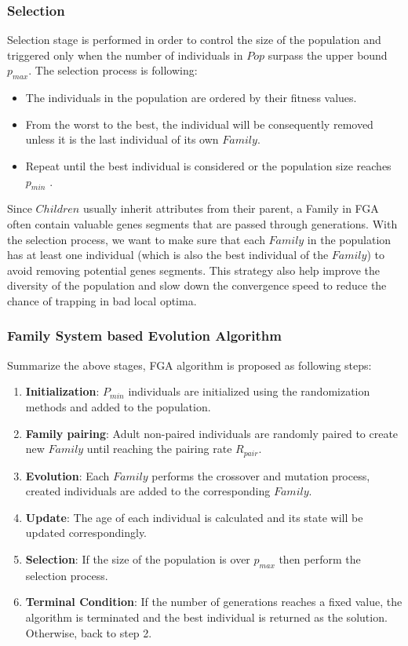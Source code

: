\documentclass[final]{elsarticle}
\begin{document}
\subsubsection{Selection}

Selection stage is performed in order to control the size of the population and triggered only when the number of individuals in $Pop$ surpass the upper bound $p_{max}$. The selection process is following: 
\begin{itemize}
	\item The individuals in the population are ordered by their fitness values. \\
	\item From the worst to the best, the individual will be consequently removed unless it is the last individual of its own $ Family $. \\
	\item Repeat until the best individual is considered or the population size reaches $p_{min}$ .\\
\end{itemize}
Since $Children$ usually inherit attributes from their parent, a Family in FGA often contain valuable genes segments that are passed through generations. With the selection process, we want to make sure that each $ Family $ in the population has at least one individual (which is also the best individual of the $ Family $) to avoid removing potential genes segments. This strategy also help improve the diversity of the population and slow down the convergence speed to reduce the chance of trapping in bad local optima.

\subsubsection{Family System based Evolution Algorithm}

Summarize the above stages, FGA algorithm is proposed as following steps:

\begin{enumerate}
	\item \textbf{Initialization}: $P_{min}$ individuals are initialized using the randomization methods and added to the population.
	\item \textbf{Family pairing}: Adult non-paired individuals are randomly paired to create new $ Family $ until reaching the pairing rate $R_{pair}$.
	\item \textbf{Evolution}: Each $ Family $ performs the crossover and mutation process, created individuals are added to the corresponding $ Family $.
	\item \textbf{Update}: The age of each individual is calculated and its state will be updated correspondingly.
	\item \textbf{Selection}: If the size of the population is over $p_{max}$ then perform the selection process.
	\item \textbf{Terminal Condition}: If the number of generations reaches a fixed value, the algorithm is terminated and the best individual is returned as the solution. Otherwise, back to step 2.
\end{enumerate}
\end{document}
